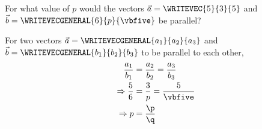 


\FRACMULT\vbfour\vbone{}\vbfive\a
\FRACMULT\vbfour\vbone{}\p\q

\question[1] For what value of $p$ would the vectors $\vec{a} = \WRITEVEC{\vbone}{\vbtwo}{\vbthree}$ and 
$\vec{b} = \WRITEVECGENERAL{\vbfour}{p}{\vbfive}$ be parallel?


\watchout

\ifprintanswers
\fi 

\begin{solution}[\mcq]
	For two vectors $\vec{a} = \WRITEVECGENERAL{a_1}{a_2}{a_3}$ and $\vec{b} = \WRITEVECGENERAL{b_1}{b_2}{b_3}$ 
	to be parallel to each other, 
	\begin{align}
		\dfrac{a_1}{b_1} &= \dfrac{a_2}{b_2} = \dfrac{a_3}{b_3} \\
		\Rightarrow \dfrac{\vbone}{\vbfour} &= \dfrac{\vbtwo}{p} = \dfrac{\vbthree}{\vbfive} \\
		\Rightarrow p &= \dfrac{\p}{\q}
	\end{align}
\end{solution}


